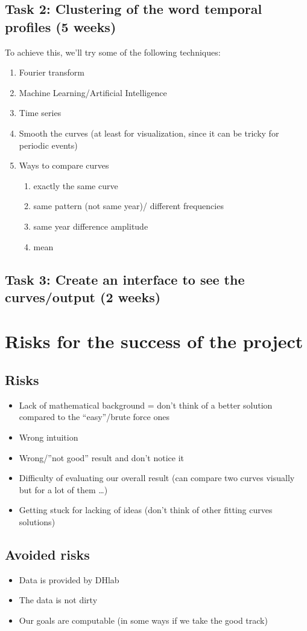 \documentclass{article}
\begin{document}
\subsection{Task 2: Clustering of the word temporal profiles (5 weeks)}
To achieve this, we'll try some of the following techniques:
\begin{enumerate}
\item Fourier transform
\item Machine Learning/Artificial Intelligence
\item Time series
\item Smooth the curves (at least for visualization, since it can be tricky for periodic events)
\item Ways to compare curves
\begin{enumerate}
\item exactly the same curve
\item same pattern (not same year)/ different frequencies
\item same year difference amplitude
\item mean
\end{enumerate}
\end{enumerate}
\subsection{Task 3: Create an interface to see the curves/output (2 weeks)}
\section{Risks for the success of the project}
\subsection{Risks}
\begin{itemize}
\item Lack of mathematical background = don’t think of a better solution compared to the “easy”/brute force ones
\item Wrong intuition 
\item Wrong/”not good” result and don’t notice it
\item Difficulty of evaluating our overall result (can compare two curves visually but for a lot of them \dots)
\item Getting stuck for lacking of ideas (don’t think of other fitting curves solutions)

\end{itemize}
\subsection{Avoided risks}
\begin{itemize}
\item Data is provided by DHlab
\item The data is not dirty
\item Our goals are computable (in some ways if we take the good track)
\end{itemize}
\end{document}

